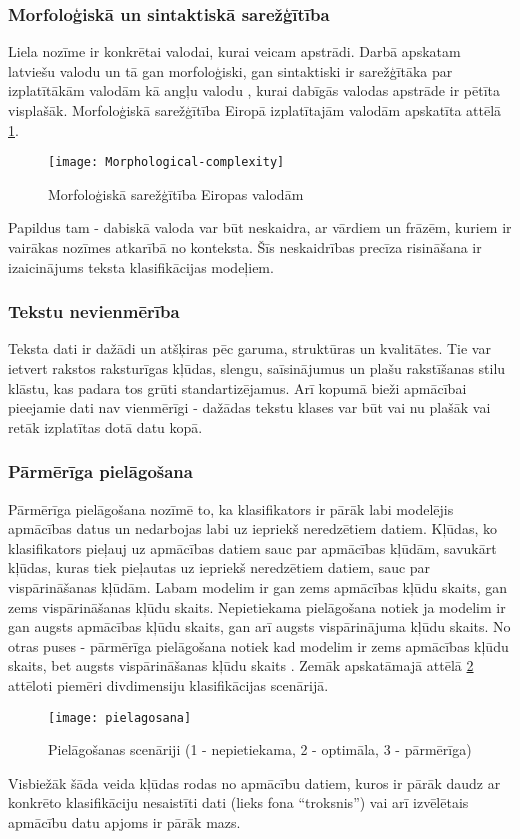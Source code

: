 \subsubsection{Morfoloģiskā un sintaktiskā sarežģītība}
Liela nozīme ir konkrētai valodai, kurai veicam apstrādi. Darbā apskatam latviešu valodu un tā gan morfoloģiski, gan sintaktiski ir  sarežģītāka par izplatītākām valodām kā angļu valodu \cite{morphologicalComplexity}, kurai dabīgās valodas apstrāde ir pētīta visplašāk. Morfoloģiskā sarežģītība Eiropā izplatītajām valodām apskatīta attēlā \ref{fig:morfologiska_sarezgitiba}.
 \begin{figure}[H]
	\texttt{[image: Morphological-complexity]}
	\caption{Morfoloģiskā sarežģītība Eiropas valodām\cite{morphologicalComplexity}}
	\label{fig:morfologiska_sarezgitiba}
\end{figure}
 
Papildus tam - dabiskā valoda var būt neskaidra, ar vārdiem un frāzēm, kuriem ir vairākas nozīmes atkarībā no konteksta. Šīs neskaidrības precīza risināšana ir izaicinājums teksta klasifikācijas modeļiem.

\subsubsection{Tekstu nevienmērība}
Teksta dati ir dažādi un atšķiras pēc garuma, struktūras un kvalitātes. Tie var ietvert rakstos raksturīgas kļūdas, slengu, saīsinājumus un plašu rakstīšanas stilu klāstu, kas padara tos grūti standartizējamus. Arī kopumā bieži apmācībai pieejamie dati nav vienmērīgi - dažādas tekstu klases var būt vai nu plašāk vai retāk izplatītas dotā datu kopā.

\subsubsection{Pārmērīga pielāgošana}
Pārmērīga pielāgošana nozīmē to, ka klasifikators ir pārāk labi modelējis apmācības datus
un nedarbojas labi uz iepriekš neredzētiem datiem. Kļūdas, ko klasifikators pieļauj uz apmācības datiem sauc par apmācības kļūdām, savukārt kļūdas, kuras tiek pieļautas uz iepriekš neredzētiem datiem, sauc par vispārināšanas kļūdām. Labam modelim ir gan zems apmācības kļūdu skaits, gan zems vispārināšanas kļūdu skaits. Nepietiekama pielāgošana notiek ja modelim ir gan augsts apmācības kļūdu skaits, gan arī augsts vispārinājuma kļūdu skaits. No otras puses - pārmērīga pielāgošana notiek kad modelim ir zems apmācības kļūdu skaits, bet augsts vispārināšanas kļūdu skaits \cite{tan2005introduction}. Zemāk apskatāmajā attēlā \ref{fig:pielagosana} attēloti piemēri divdimensiju klasifikācijas scenārijā.

\begin{figure}[H]
	\texttt{[image: pielagosana]}
	\caption{Pielāgošanas scenāriji (1 - nepietiekama, 2 - optimāla, 3 - pārmērīga)}
	\label{fig:pielagosana}
\end{figure}
 
Visbiežāk šāda veida kļūdas rodas no apmācību datiem, kuros ir pārāk daudz ar konkrēto klasifikāciju nesaistīti dati (lieks fona “troksnis”) vai arī izvēlētais apmācību datu apjoms ir pārāk mazs.

